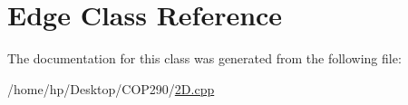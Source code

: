 \hypertarget{class_edge}{}\section{Edge Class Reference}
\label{class_edge}


The documentation for this class was generated from the following file\+:\begin{DoxyCompactItemize}
\item 
/home/hp/\+Desktop/\+C\+O\+P290/\hyperlink{2_d_8cpp}{2\+D.\+cpp}\end{DoxyCompactItemize}
